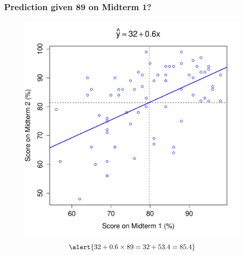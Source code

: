 \documentclass[handout]{beamer}
\begin{document}
\begin{frame}
\frametitle{Prediction given 89 on Midterm 1? }
\begin{figure}
	\includegraphics[scale = 0.38]{./images/midterms5}
	$$\alert{32 + 0.6 \times 89 = 32 + 53.4 = 85.4}$$
\end{figure}
\end{frame}
\end{document}
